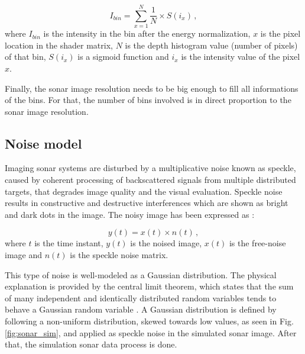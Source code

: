 \documentclass[final,5p,times]{elsarticle}
\begin{document}
\begin{equation}
    \label{eq:1}
    I_{bin} = \sum\limits_{x=1}^N \frac{1}{N} \times S(i_{x}) \, ,
\end{equation}
where $I_{bin}$ is the intensity in the bin after the energy normalization, $x$ is the pixel location in the shader matrix, $N$ is the depth histogram value (number of pixels) of that bin, $S(i_{x})$ is a sigmoid function and $i_{x}$ is the intensity value of the pixel $x$.

Finally, the sonar image resolution needs to be big enough to fill all informations of the bins. For that, the number of bins involved is in direct proportion to the sonar image resolution.


\subsection{Noise model}
\label{dev:noise}

Imaging sonar systems are disturbed by a multiplicative noise known as speckle, caused by coherent processing of backscattered signals from multiple distributed targets, that degrades image quality and the visual evaluation. Speckle noise results in constructive and destructive interferences which are shown as bright and dark dots in the image. The noisy image has been expressed as \cite{lee1980}:

\begin{equation}
\label{eq:2}
y(t) = x(t) \times n(t) \, ,
\end{equation}
where $t$ is the time instant, $y(t)$ is the noised image, $x(t)$ is the free-noise image and $n(t)$ is the speckle noise matrix.

This type of noise is well-modeled as a Gaussian distribution. The physical explanation is provided by the central limit theorem, which states that the sum of many independent and identically distributed random variables tends to behave a Gaussian random variable \cite{papoulis2002}. A Gaussian distribution is defined by following a non-uniform distribution, skewed towards low values, as seen in Fig. \ref{fig:sonar_sim}, and applied as speckle noise in the simulated sonar image. After that, the simulation sonar data process is done.
\end{document}
